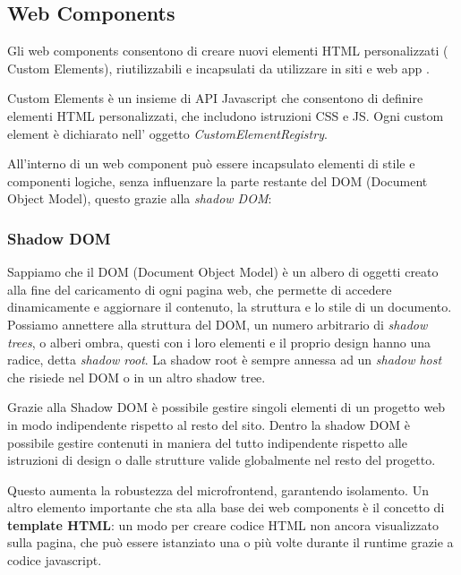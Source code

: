 \subsection*{Web Components}
Gli web components consentono di creare nuovi elementi HTML personalizzati ( Custom Elements), riutilizzabili e incapsulati
da utilizzare in siti e web app \cite{webcomponents}.

Custom Elements è un insieme di API Javascript che consentono di definire elementi HTML personalizzati, che includono istruzioni CSS e JS.
Ogni custom element è dichiarato nell' oggetto \emph{CustomElementRegistry}.
\linebreak

All'interno di un web component può essere incapsulato elementi di stile e componenti logiche, senza influenzare
la parte restante del DOM (Document Object Model), questo grazie alla \emph{shadow DOM}:
\subsubsection*{Shadow DOM}
Sappiamo che il DOM (Document Object Model) è un albero di oggetti creato alla fine del caricamento di ogni pagina web, che 
permette di accedere dinamicamente e aggiornare il contenuto, la struttura e lo stile di un documento.\cite{dom}
Possiamo annettere alla struttura del DOM, un numero arbitrario di \emph{shadow trees}, 
o alberi ombra, questi con i loro elementi e il proprio design hanno una radice, detta  \emph{shadow root}.
La shadow root è sempre annessa ad un \emph{shadow host} che risiede nel DOM o in un altro shadow tree.

Grazie alla Shadow DOM è possibile gestire singoli elementi di un progetto web in modo indipendente rispetto al resto del sito.
Dentro la shadow DOM è possibile gestire contenuti in maniera del tutto indipendente rispetto alle istruzioni di design o dalle strutture
valide globalmente nel resto del progetto.

Questo aumenta la robustezza del microfrontend, garantendo isolamento.
\linebreak
\linebreak
Un altro elemento importante che sta alla base dei web components è il concetto di \textbf{template HTML}: 
un modo per creare codice HTML non ancora visualizzato sulla pagina, che può essere istanziato una o più volte 
durante il runtime grazie a codice javascript.



